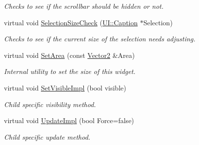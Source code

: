 \begin{DoxyCompactItemize}
\begin{DoxyCompactList}\small\item\em Checks to see if the scrollbar should be hidden or not. \item\end{DoxyCompactList}\item 
\hypertarget{classMezzanine_1_1UI_1_1ListBox_a215031e08cffa9ecdf5984a6f5905ce1}{
virtual void \hyperlink{classMezzanine_1_1UI_1_1ListBox_a215031e08cffa9ecdf5984a6f5905ce1}{SelectionSizeCheck} (\hyperlink{classMezzanine_1_1UI_1_1Caption}{UI::Caption} $\ast$Selection)}
\label{classMezzanine_1_1UI_1_1ListBox_a215031e08cffa9ecdf5984a6f5905ce1}

\begin{DoxyCompactList}\small\item\em Checks to see if the current size of the selection needs adjusting. \item\end{DoxyCompactList}\item 
\hypertarget{classMezzanine_1_1UI_1_1ListBox_a157f39b08affbdde167de25151319f0c}{
virtual void \hyperlink{classMezzanine_1_1UI_1_1ListBox_a157f39b08affbdde167de25151319f0c}{SetArea} (const \hyperlink{classMezzanine_1_1Vector2}{Vector2} \&Area)}
\label{classMezzanine_1_1UI_1_1ListBox_a157f39b08affbdde167de25151319f0c}

\begin{DoxyCompactList}\small\item\em Internal utility to set the size of this widget. \item\end{DoxyCompactList}\item 
\hypertarget{classMezzanine_1_1UI_1_1ListBox_ad70ab1d9652ff71ca110034d2f0e1986}{
virtual void \hyperlink{classMezzanine_1_1UI_1_1ListBox_ad70ab1d9652ff71ca110034d2f0e1986}{SetVisibleImpl} (bool visible)}
\label{classMezzanine_1_1UI_1_1ListBox_ad70ab1d9652ff71ca110034d2f0e1986}

\begin{DoxyCompactList}\small\item\em Child specific visibility method. \item\end{DoxyCompactList}\item 
\hypertarget{classMezzanine_1_1UI_1_1ListBox_a929549e3a6a88d31cd16c9483a631379}{
virtual void \hyperlink{classMezzanine_1_1UI_1_1ListBox_a929549e3a6a88d31cd16c9483a631379}{UpdateImpl} (bool Force=false)}
\label{classMezzanine_1_1UI_1_1ListBox_a929549e3a6a88d31cd16c9483a631379}

\begin{DoxyCompactList}\small\item\em Child specific update method. \item\end{DoxyCompactList}\end{DoxyCompactItemize}
